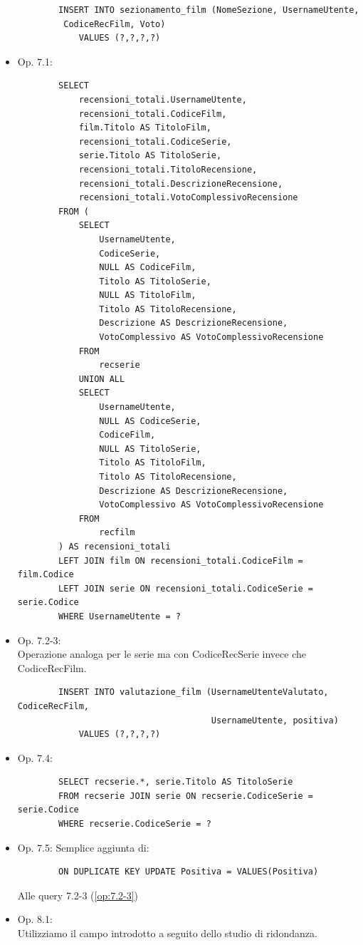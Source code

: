 \documentclass[a4paper,12pt]{report}
\begin{document}
\begin{itemize}
\begin{verbatim}
		INSERT INTO sezionamento_film (NomeSezione, UsernameUtente,
		 CodiceRecFilm, Voto)
			VALUES (?,?,?,?)
	\end{verbatim}
	\item Op. 7.1:
	\begin{verbatim}
		SELECT
			recensioni_totali.UsernameUtente,
			recensioni_totali.CodiceFilm,
			film.Titolo AS TitoloFilm,
			recensioni_totali.CodiceSerie,
			serie.Titolo AS TitoloSerie,
			recensioni_totali.TitoloRecensione,
			recensioni_totali.DescrizioneRecensione,
			recensioni_totali.VotoComplessivoRecensione
		FROM (
			SELECT
				UsernameUtente,
				CodiceSerie,
				NULL AS CodiceFilm,
				Titolo AS TitoloSerie,
				NULL AS TitoloFilm,
				Titolo AS TitoloRecensione,
				Descrizione AS DescrizioneRecensione,
				VotoComplessivo AS VotoComplessivoRecensione
			FROM
				recserie
			UNION ALL
			SELECT
				UsernameUtente,
				NULL AS CodiceSerie,
				CodiceFilm,
				NULL AS TitoloSerie,
				Titolo AS TitoloFilm,
				Titolo AS TitoloRecensione,
				Descrizione AS DescrizioneRecensione,
				VotoComplessivo AS VotoComplessivoRecensione
			FROM
				recfilm
		) AS recensioni_totali
		LEFT JOIN film ON recensioni_totali.CodiceFilm = film.Codice
		LEFT JOIN serie ON recensioni_totali.CodiceSerie = serie.Codice
		WHERE UsernameUtente = ?
	\end{verbatim}
	\item Op. 7.2-3: \label{op:7.2-3}\\
	Operazione analoga per le serie ma con CodiceRecSerie invece che CodiceRecFilm.
	\begin{verbatim}
		INSERT INTO valutazione_film (UsernameUtenteValutato, CodiceRecFilm,
									  UsernameUtente, positiva)
			VALUES (?,?,?,?)
	\end{verbatim}
	\item Op. 7.4:
	\begin{verbatim}
		SELECT recserie.*, serie.Titolo AS TitoloSerie
		FROM recserie JOIN serie ON recserie.CodiceSerie = serie.Codice
		WHERE recserie.CodiceSerie = ?
	\end{verbatim}
	\item Op. 7.5: Semplice aggiunta di:
	\begin{verbatim}
		ON DUPLICATE KEY UPDATE Positiva = VALUES(Positiva)
	\end{verbatim}
	Alle query 7.2-3 (\ref{op:7.2-3})
	\item Op. 8.1:\\
	Utilizziamo il campo introdotto a seguito dello studio di ridondanza.
	\begin{verbatim}

\end{verbatim}
\end{itemize}
\end{document}
